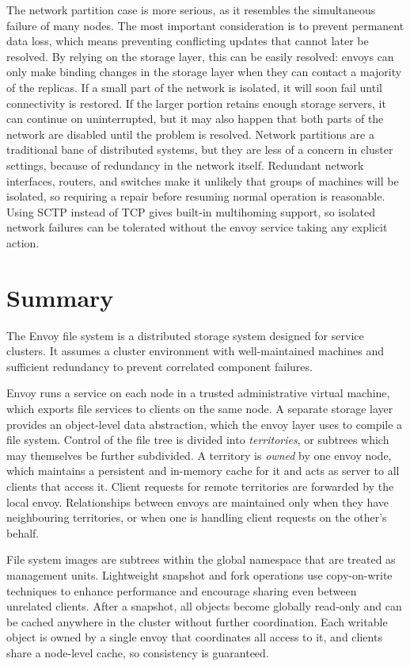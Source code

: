 The network partition case is more serious, as it resembles the simultaneous failure of many nodes. The most important consideration is to prevent permanent data loss, which means preventing conflicting updates that cannot later be resolved. By relying on the storage layer, this can be easily resolved: envoys can only make binding changes in the storage layer when they can contact a majority of the replicas. If a small part of the network is isolated, it will soon fail until connectivity is restored. If the larger portion retains enough storage servers, it can continue on uninterrupted, but it may also happen that both parts of the network are disabled until the problem is resolved. Network partitions are a traditional bane of distributed systems, but they are less of a concern in cluster settings, because of redundancy in the network itself. Redundant network interfaces, routers, and switches make it unlikely that groups of machines will be isolated, so requiring a repair before resuming normal operation is reasonable. Using SCTP \cite{stewart} instead of TCP gives built-in multihoming support, so isolated network failures can be tolerated without the envoy service taking any explicit action.

\section{Summary}

The Envoy file system is a distributed storage system designed for service clusters. It assumes a cluster environment with well-maintained machines and sufficient redundancy to prevent correlated component failures.

Envoy runs a service on each node in a trusted administrative virtual machine, which exports file services to clients on the same node. A separate storage layer provides an object-level data abstraction, which the envoy layer uses to compile a file system. Control of the file tree is divided into \emph{territories}, or subtrees which may themselves be further subdivided. A territory is \emph{owned} by one envoy node, which maintains a persistent and in-memory cache for it and acts as server to all clients that access it. Client requests for remote territories are forwarded by the local envoy.  Relationships between envoys are maintained only when they have neighbouring territories, or when one is handling client requests on the other's behalf.

File system images are subtrees within the global namespace that are treated as management units. Lightweight snapshot and fork operations use copy-on-write techniques to enhance performance and encourage sharing even between unrelated clients. After a snapshot, all objects become globally read-only and can be cached anywhere in the cluster without further coordination. Each writable object is owned by a single envoy that coordinates all access to it, and clients share a node-level cache, so consistency is guaranteed.

